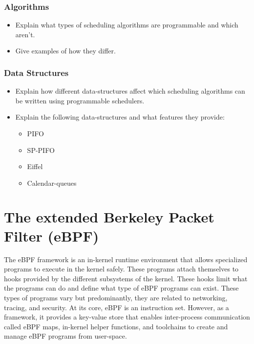 \documentclass[sigconf, nonacm]{acmart}
\begin{document}
\subsubsection{Algorithms}

\begin{itemize}
  \item Explain what types of scheduling algorithms are programmable and which aren't.
  \item Give examples of how they differ.
\end{itemize}


\subsubsection{Data Structures}

\begin{itemize}
  \item Explain how different data-structures affect which scheduling algorithms can be written using programmable schedulers.
  \item Explain the following data-structures and what features they provide:
        \begin{itemize}
          \item PIFO\cite{Sivaraman2016}
          \item SP-PIFO\cite{Alcoz2020}
          \item Eiffel\cite{Saeed2019}
          \item Calendar-queues\cite{KrSharma2020}
        \end{itemize}
\end{itemize}

\section{The extended Berkeley Packet Filter (eBPF)}

The eBPF framework is an in-kernel runtime environment that allows specialized
programs to execute in the kernel safely. These programs attach themselves to
hooks provided by the different subsystems of the kernel. These hooks limit what
the programs can do and define what type of eBPF programs can exist. These types
of programs vary but predominantly, they are related to networking, tracing, and
security. At its core, eBPF is an instruction set. However, as a framework, it
provides a key-value store that enables inter-process communication called eBPF
maps, in-kernel helper functions, and toolchains to create and manage eBPF
programs from user-space.
\end{document}
